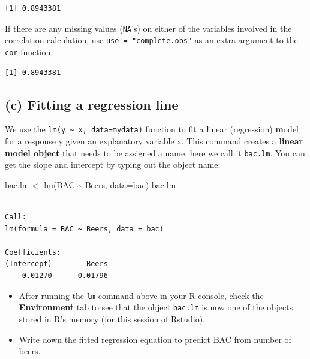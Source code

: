\documentclass[
]{book}
\newenvironment{Shaded}{\begin{snugshade}}{\end{snugshade}}
\newcommand{\AttributeTok}[1]{\textcolor[rgb]{0.77,0.63,0.00}{#1}}
\newcommand{\FunctionTok}[1]{\textcolor[rgb]{0.00,0.00,0.00}{#1}}
\newcommand{\NormalTok}[1]{#1}
\newcommand{\OtherTok}[1]{\textcolor[rgb]{0.56,0.35,0.01}{#1}}
\newcommand{\SpecialCharTok}[1]{\textcolor[rgb]{0.00,0.00,0.00}{#1}}
\newcommand{\StringTok}[1]{\textcolor[rgb]{0.31,0.60,0.02}{#1}}
\providecommand{\tightlist}{%
  \setlength{\itemsep}{0pt}\setlength{\parskip}{0pt}}
\begin{document}
\begin{verbatim}
[1] 0.8943381
\end{verbatim}

If there are any missing values (\texttt{NA}'s) on either of the variables involved in the correlation calculation, use \texttt{use\ =\ "complete.obs"} as an extra argument to the \texttt{cor} function.

\begin{Shaded}
\end{Shaded}

\begin{verbatim}
[1] 0.8943381
\end{verbatim}

\hypertarget{c-fitting-a-regression-line}{%
\subsection{(c) Fitting a regression line}\label{c-fitting-a-regression-line}}

We use the \texttt{lm(y\ \textasciitilde{}\ x,\ data=mydata)} function to fit a \textbf{l}inear (regression) \textbf{m}odel for a response y given an explanatory variable x. This command creates a \textbf{linear model object} that needs to be assigned a name, here we call it \texttt{bac.lm}. You can get the slope and intercept by typing out the object name:

\begin{Shaded}
\begin{Highlighting}[]
\NormalTok{bac.lm }\OtherTok{\textless{}{-}} \FunctionTok{lm}\NormalTok{(BAC }\SpecialCharTok{\textasciitilde{}}\NormalTok{ Beers, }\AttributeTok{data=}\NormalTok{bac)}
\NormalTok{bac.lm}
\end{Highlighting}
\end{Shaded}

\begin{verbatim}

Call:
lm(formula = BAC ~ Beers, data = bac)

Coefficients:
(Intercept)        Beers  
   -0.01270      0.01796  
\end{verbatim}

\begin{itemize}
\tightlist
\item
  After running the \texttt{lm} command above in your R console, check the \textbf{Environment} tab to see that the object \texttt{bac.lm} is now one of the objects stored in R's memory (for this session of Rstudio).
\item
  Write down the fitted regression equation to predict BAC from number of beers.
\end{itemize}
\end{document}
